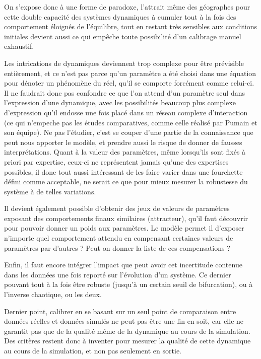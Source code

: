 On s'expose donc à une forme de paradoxe, l'attrait même des géographes pour cette double capacité des systèmes dynamiques à cumuler tout à la fois des comportement éloignés de l'équilibre, tout en restant très sensibles aux conditions initiales devient aussi ce qui empêche toute possibilité d'un calibrage manuel exhaustif.

Les intrications de dynamiques deviennent trop complexe pour être prévisible entièrement, et ce n'est pas parce qu'un paramètre a été choisi dans une équation pour dénoter un phénomène du réel, qu'il se comporte forcément comme celui-ci. Il ne faudrait donc pas confondre ce que l'on attend d'un paramètre seul dans l'expression d'une dynamique, avec les possibilités beaucoup plus complexe d'expression qu'il endosse une fois placé dans un réseau complexe d'interaction (ce qui n'empeche pas les études comparatives, comme celle réalisé par Pumain et son équipe). Ne pas l'étudier, c'est se couper d'une partie de la connaissance que peut nous apporter le modèle, et prendre aussi le risque de donner de fausses interprétations. Quant à la valeur des paramètres, même lorsqu'ils sont fixés à priori par expertise, ceux-ci ne représentent jamais qu'une des expertises possibles, il donc tout aussi intéressant de les faire varier dans une fourchette défini comme acceptable, ne serait ce que pour mieux mesurer la robustesse du système à de telles variations.

Il devient également possible d'obtenir des jeux de valeurs de paramètres exposant des comportements finaux similaires (attracteur), qu'il faut découvrir pour pouvoir donner un poids aux paramètres. Le modèle permet il d'exposer n'importe quel comportement attendu en compensant certaines valeurs de paramètres par d'autres ? Peut on donner la liste de ces compensations ? 

Enfin, il faut encore intégrer l'impact que peut avoir cet incertitude contenue dans les données une fois reporté sur l'évolution d'un système. Ce dernier pouvant tout à la fois être robuste (jusqu'à un certain seuil de bifurcation), ou à l'inverse chaotique, ou les deux.

Dernier point, calibrer en se basant sur un seul point de comparaison entre données réelles et données simulés ne peut pas être une fin en soit, car elle ne garantit pas que de la qualité même de la dynamique au cours de la simulation. Des critères restent donc à inventer pour mesurer la qualité de cette dynamique au cours de la simulation, et non pas seulement en sortie.

